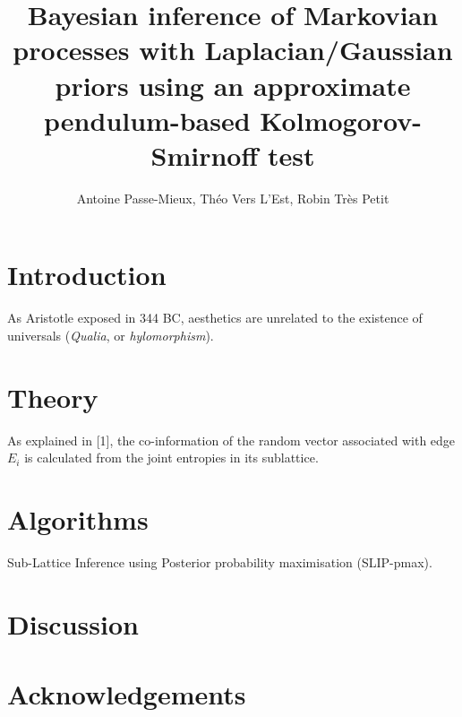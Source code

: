 \documentclass[a4paper]{article}
\author{Antoine Passe-Mieux, Théo Vers L'Est, Robin Très Petit}
\title{Bayesian inference of Markovian processes with Laplacian/Gaussian priors
using an approximate pendulum-based Kolmogorov-Smirnoff test}
\begin{document}
\maketitle

\section{Introduction}
As Aristotle exposed in 344 BC, aesthetics are unrelated to the existence of
universals (\emph{Qualia}, or \emph{hylomorphism}).

\section{Theory}
As explained in [1], the co-information of the random vector associated with
edge $E_i$ is calculated from the joint entropies in its sublattice.

\section{Algorithms}
Sub-Lattice Inference using Posterior probability maximisation (SLIP-pmax).

\section{Discussion}

\section{Acknowledgements}
\end{document}
